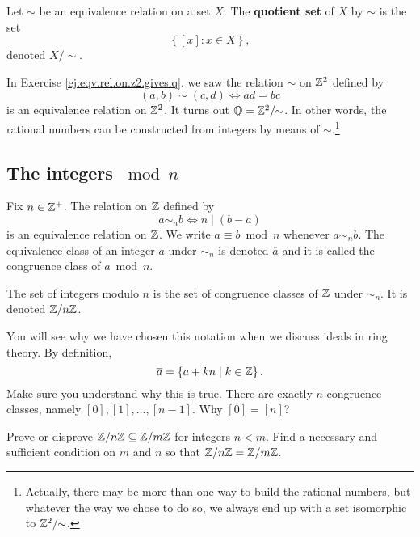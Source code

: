 \documentclass[11pt,a4paper]{article}
\begin{document}
\begin{defi}
    Let \(\sim\) be an equivalence relation on a set \(X\).
    The \textbf{quotient set} of \(X\) by \(\sim\) is the set 
    \[\left\{ [x] : x \in X \right\},\]
    denoted \(X/ \!\!\sim\).

\end{defi}


\begin{exa}
    In Exercise \ref{ej:eqv.rel.on.z2.gives.q}.
    we saw the relation \(\sim\) on \(\mathbb{Z}^2\) defined by 
    \[(a,b) \sim (c,d) \iff ad = bc\]
    is an equivalence relation on \( \mathbb{Z}^2\).
    It turns out 
    \(\mathbb{Q} = \mathbb{Z}^2 / \!\! \sim\).
    In other words, the rational numbers can be constructed from integers by means of \(\sim\).\footnote{Actually, there may be more than one way to build the rational numbers, but whatever the way we chose to do so, we always end up with  a set isomorphic  to \( \mathbb{Z}^2 / \!\! \sim\).}
\end{exa}

\subsection[]{The integers \(\bmod n\)}

Fix \(n\in \mathbb{Z}^+\).
The relation  on \(\mathbb{Z}\) defined by 
\[a\sim_n b\iff n\mid (b-a)\]
is an equivalence relation on \(\mathbb{Z}\).
We write \(a \equiv b \bmod n\)
whenever \(a \sim_n b\).
The equivalence class of an integer \(a\) under \(\sim_n\) is denoted \(\overline{a}\) and it is called the congruence class of \(a\bmod n\).

\begin{defi}
    The set of integers modulo \(n\) is the set of congruence classes of \(\mathbb{Z}\) under \(\sim_n\).
    It is denoted \(\mathbb{Z}/ n \mathbb{Z}\).
\end{defi}

You will see why we have chosen this notation when we discuss ideals in ring theory.
By definition, 
\[\overline{a} = \left\{ a + k n \mid k\in \mathbb{Z} \right\}.\]
Make sure you understand why this is true.
There are exactly \(n\) congruence classes,
namely 
\([0],[1],\ldots,[n-1].\)
Why \([0] = [n]\)?

\begin{eje}
    Prove or disprove \(\mathbb{Z}/n\mathbb{Z} \subseteq \mathbb{Z}/m \mathbb{Z}\) for integers \(n< m\).
    Find a necessary and sufficient condition on \(m\) and \(n\) so that \(\mathbb{Z}/n\mathbb{Z} =  \mathbb{Z}/m \mathbb{Z}\).
\end{eje}
\end{document}
